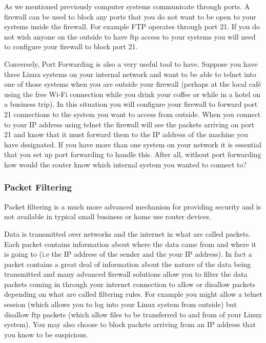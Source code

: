 As we mentioned previously computer systems communicate through ports. A
firewall can be used to block any ports that you do not want to be open to your
systems inside the firewall. For example FTP operates through port 21. If you do
not wish anyone on the outside to have ftp access to your systems you will need
to configure your firewall to block port 21.



Conversely, Port Forwarding is also a very useful tool to have. Suppose you have
three Linux systems on your internal network and want to be able to telnet into
one of those systems when you are outside your firewall (perhaps at the local
café using the free Wi-Fi connection while you drink your coffee or while in a
hotel on a business trip). In this situation you will configure your firewall to
forward port 21 connections to the system you want to access from outside. When
you connect to your IP address using telnet the firewall will see the packets
arriving on port 21 and know that it must forward them to the IP address of the
machine you have designated. If you have more than one system on your network it
is essential that you set up port forwarding to handle this. After all, without
port forwarding how would the router know which internal system you wanted to
connect to?



\subsubsectionend

\subsubsection{Packet Filtering}
\label{sssec:packet_filtering}

Packet filtering is a much more advanced mechanism for providing security and is
not available in typical small business or home use router devices.



Data is transmitted over networks and the internet in what are called packets.
Each packet contains information about where the data came from and where it is
going to (i.e the IP address of the sender and the your IP address). In fact a
packet contains a great deal of information about the nature of the data being
transmitted and many advanced firewall solutions allow you to filter the data
packets coming in through your internet connection to allow or disallow packets
depending on what are called filtering rules. For example you might allow a
telnet session (which allows you to log into your Linux system from outside) but
disallow ftp packets (which allow files to be transferred to and from of your
Linux system). You may also choose to block packets arriving from an IP address
that you know to be suspicious.



